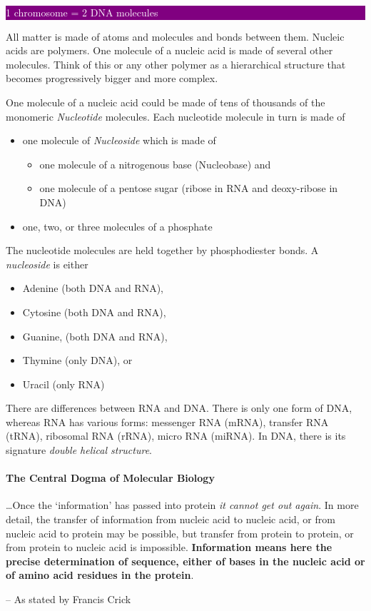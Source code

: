 \documentclass[12pt]{article}
\newcommand{\ctext}[3]{
    \colorbox{#2}{\parbox{0.9\textwidth}{\textcolor{#1}{#3}}}
}
\begin{document}
\ctext{white}{purple}{
    1 chromosome = 2 DNA molecules
}

All matter is made of atoms and molecules and bonds between them. Nucleic acids are polymers. One molecule of a nucleic acid is made of several other molecules. Think of this or any other polymer as a hierarchical structure that becomes progressively bigger and more complex.

One molecule of a nucleic acid could be made of tens of thousands of the monomeric \emph{Nucleotide} molecules. Each nucleotide molecule in turn is made of 
\begin{itemize}
    \item one molecule of \emph{Nucleoside} which is made of
        \begin{itemize}
            \item one molecule of a nitrogenous base (Nucleobase) and
            \item one molecule of a pentose sugar (ribose in RNA and deoxy-ribose in DNA)
        \end{itemize}
    \item one, two, or three molecules of a phosphate 
\end{itemize}

The nucleotide molecules are held together by phosphodiester bonds. A \emph{nucleoside} is either
\begin{itemize}
    \item Adenine (both DNA and RNA),
    \item Cytosine (both DNA and RNA),
    \item Guanine, (both DNA and RNA),
    \item Thymine (only DNA), or
    \item Uracil (only RNA)
\end{itemize}

There are differences between RNA and DNA. There is only one form of DNA, whereas RNA has various forms: messenger RNA (mRNA), transfer RNA (tRNA), ribosomal RNA (rRNA), micro RNA (miRNA). In DNA, there is its signature \emph{double helical structure}. 


\paragraph{The Central Dogma of Molecular Biology}
\label{para: central-dogma}
\epigraph
{
    \dots Once the `information' has passed into protein \textit{it cannot get out again}. In more detail, the transfer of information from nucleic acid to nucleic acid, or from nucleic acid to protein may be possible, but transfer from protein to protein, or from protein to nucleic acid is impossible. \textbf{Information means here the precise determination of sequence, either of bases in the nucleic acid or of amino acid residues in the protein}.
}
{
    -- As stated by Francis Crick \cite{the-central-dogma}
}
\end{document}
